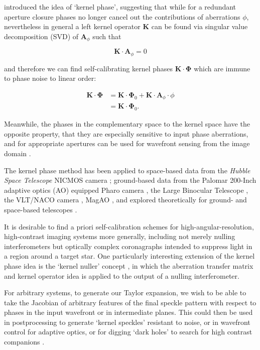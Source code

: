 \documentclass[modern]{aastex63}
\begin{document}
\citet{martinache10} introduced the idea of `kernel phase', suggesting that while for a redundant aperture closure phases no longer cancel out the contributions of aberrations $\phi$, nevertheless in general a left kernel operator $\mathbf{K}$ can be found via singular value decomposition (SVD) of $\mathbf{A}_\phi$ such that

\begin{equation}
        \mathbf{K}\cdot\mathbf{A}_\phi = 0
\end{equation}

\noindent and therefore we can find self-calibrating kernel phases $\mathbf{K}\cdot\mathbf{\Phi}$ which are immune to phase noise to linear order:

\begin{align}
    \mathbf{K}\cdot\mathbf{\Phi} &= \mathbf{K}\cdot\mathbf{\Phi}_0 + \mathbf{K}\cdot\mathbf{A}_\phi\cdot\phi \\
    &= \mathbf{K}\cdot\mathbf{\Phi}_0.
\end{align}

Meanwhile, the phases in the complementary space to the kernel space have the opposite property, that they are especially sensitive to input phase aberrations, and for appropriate apertures can be used for wavefront sensing from the image domain \citep{martinache13,pope14}.

The kernel phase method has been applied to space-based data from the \textit{Hubble Space Telescope} NICMOS camera \citep{pope13,laugier19,martinache20}; ground-based data from the Palomar 200-Inch adaptive optics (AO) equipped Pharo camera \citep{palomar,martinache20}, the Large Binocular Telescope \citep{sallum15}, the VLT/NACO camera \citep{kammerer19}, MagAO \citep{sallum19b}, and explored theoretically for ground- and space-based telescopes \citep{ireland13,martinache11,sallum19a,ceau19}.

It is desirable to find a priori self-calibration schemes for high-angular-resolution, high-contrast imaging systems more generally, including not merely nulling interferometers but optically complex coronagraphs intended to suppress light in a region around a target star. One particularly interesting extension of the kernel phase idea is the `kernel nuller' concept \citep{martinache18}, in which the aberration transfer matrix and kernel operator idea is applied to the output of a nulling interferometer. 

For arbitrary systems, to generate our Taylor expansion, we wish to be able to take the Jacobian of arbitrary features of the final speckle pattern with respect to phases in the input wavefront or in intermediate planes. This could then be used in postprocessing to generate `kernel speckles' resistant to noise, or in wavefront control for adaptive optics, or for digging `dark holes' to search for high contrast companions \citep{malbet95}.
\end{document}
